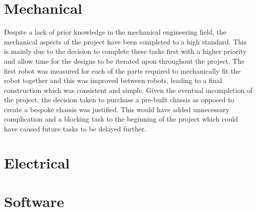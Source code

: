 \section{Mechanical}\label{eval/mech}
Despite a lack of prior knowledge in the mechanical engineering field, the mechanical aspects of the project have been completed to a high standard. This is mainly due to the decision to complete these tasks first with a higher priority and allow time for the designs to be iterated upon throughout the project. The first robot was measured for each of the parts required to mechanically fit the robot together and this was improved between robots, leading to a final construction which was consistent and simple. Given the eventual incompletion of the project, the decision taken to purchase a pre-built chassis as opposed to create a bespoke chassis was justified. This would have added unnecessary complication and a blocking task to the beginning of the project which could have caused future tasks to be delayed further. 



\section{Electrical}\label{eval/elec}

\section{Software}\label{eval/soft}
\todo{}
